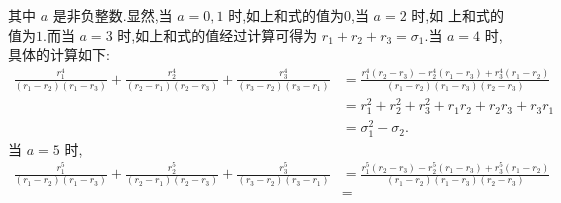 \documentclass[twoside,11pt]{article} \usepackage{amsmath,amsfonts,bm}
\begin{document}
其中 $a$ 是非负整数.显然,当 $a=0,1$ 时,如上和式的值为$0$,当 $a=2$ 时,如
上和式的值为$1$.而当 $a=3$ 时,如上和式的值经过计算可得为
$r_1+r_2+r_3=\sigma_1$.当 $a=4$ 时,具体的计算如下:
\begin{align*}
  \frac{r_1^4}{(r_1-r_2)(r_1-r_3)}+\frac{r_2^4}{(r_2-r_1)(r_2-r_3)}+\frac{r_3^4}{(r_3-r_2)(r_3-r_1)}&=\frac{r_1^{4}(r_{2}-r_{3})-r_{2}^{4}(r_{1}-r_{3})+r_{3}^{4}(r_{1}-r_{2})}{(r_1-r_2)(r_1-r_3)(r_2-r_3)}\\&=r_1^2+r_2^2+r_3^2+r_1r_2+r_2r_3+r_3r_1\\&=\sigma_1^2-\sigma_2.
\end{align*}
当 $a=5$ 时,
\begin{align*}
  \frac{r_1^5}{(r_1-r_2)(r_1-r_3)}+\frac{r_2^5}{(r_2-r_1)(r_2-r_3)}+\frac{r_3^5}{(r_3-r_2)(r_3-r_1)}&=\frac{r_1^{5}(r_{2}-r_{3})-r_{2}^{5}(r_{1}-r_{3})+r_{3}^{5}(r_{1}-r_{2})}{(r_1-r_2)(r_1-r_3)(r_2-r_3)}\\&=
\end{align*}

\fi
\end{document}
